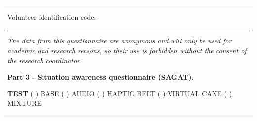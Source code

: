 \begin{table}[!htb]
    \centering
    \begin{tabular}{m{1\linewidth}}

        {\color{gray}

        Volunteer identification code: \rule{1in}{.2mm}
        
        \textit{The data from this questionnaire are anonymous and will only be used for academic and research reasons, so their use is forbidden without the consent of the research coordinator.}
        }
        
        \begin{center}
        \textbf{Part 3 - Situation awareness questionnaire (SAGAT).}
        \end{center}
        
        \noindent
        \textbf{TEST} ( ) BASE \hfill ( ) AUDIO \hfill ( ) HAPTIC BELT \hfill ( ) VIRTUAL CANE \hfill ( ) MIXTURE
        

\end{tabular}
\end{table}
